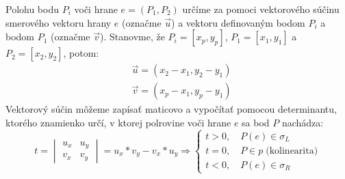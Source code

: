 \documentclass[11pt]{article}
\begin{document}
\noindent Polohu bodu $P_i$ voči hrane $e = (P_1, P_2)$ určíme za pomoci vektorového súčinu smerového vektoru hrany $e$ (označme $\vec{u}$) a vektoru definovaným bodom $P_i$ a bodom $P_1$ (označme $\vec{v}$).
\newline Stanovme, že $P_i=[x_p,y_p]$, $P_1=[x_1,y_1]$ a $P_2=[x_2,y_2]$, potom:
\begin{align}
    \nonumber&\vec{u}=(x_2-x_1,y_2-y_1)\\
    \nonumber&\vec{v}=(x_p-x_1,y_p-y_1)
\end{align}
\noindent Vektorový súčin môžeme zapísať maticovo a vypočítať pomocou determinantu, ktorého znamienko určí, v ktorej polrovine voči hrane $e$ sa bod $P$ nachádza:
\begin{equation*}
t=\begin{vmatrix} u_x & u_y \\ v_x & v_y  \end{vmatrix}=u_x*v_y-v_x*u_y \Rightarrow
\begin{cases}
    t>0, \quad P(e)  \in \sigma_L \\
    t=0, \quad P  \in p \; \text{(kolinearita)}\\
    t<0, \quad P(e)  \in \sigma_R
\end{cases}
\end{equation*}
\end{document}
